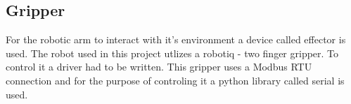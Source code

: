 \subsection{Gripper}
For the robotic arm to interact with it's environment a device called effector is used. 
The robot used in this project utlizes a robotiq - two finger gripper. To control it
a driver had to be written. This gripper uses a Modbus RTU connection and 
for the purpose of controling it a python library called serial is used. 